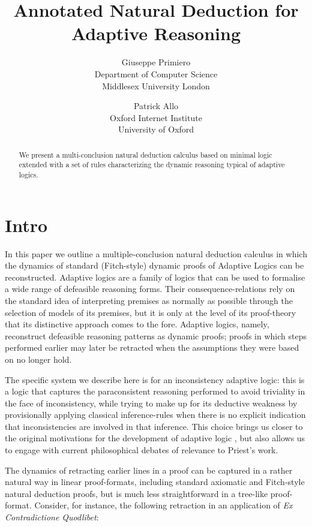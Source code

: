 \documentclass[]{article}
\title{Annotated Natural Deduction for Adaptive Reasoning}
\author{Giuseppe Primiero\\
Department of Computer Science\\
Middlesex University London\\
 \and Patrick Allo\\
 Oxford Internet Institute\\
 University of Oxford}
\date{}
\begin{document}
\maketitle

\begin{abstract}
We present a multi-conclusion natural deduction calculus based on minimal logic extended with a set of rules characterizing the dynamic reasoning typical of adaptive logics.
\end{abstract}

\section{Intro}

In this paper we outline a multiple-conclusion natural deduction calculus in which the dynamics of standard (Fitch-style) dynamic proofs of Adaptive Logics \cite{batens07} can be reconstructed. Adaptive logics are a family of logics that can be used to formalise a wide range of defeasible reasoning forms. Their consequence-relations rely on the standard idea of interpreting premises as normally as possible through the selection of models of its premises, but it is only at the level of its proof-theory that its distinctive approach comes to the fore. Adaptive logics, namely, reconstruct defeasible reasoning patterns as dynamic proofs; proofs in which steps performed earlier may later be retracted when the assumptions they were based on no longer hold.

The specific system we describe here is for an inconsistency adaptive logic: this is a logic that captures the paraconsistent reasoning performed to avoid triviality in the face of inconsistency, while trying to make up for its deductive weakness by provisionally applying classical inference-rules when there is no explicit indication that inconsistencies are involved in that inference. This choice brings us closer to the original motivations for the development of adaptive logic \cite{Batens:ParaconsistentLogicEssaysOnTheInconsistent:1989}, but also allows us to engage with current philosophical debates of relevance to Priest's work.

The dynamics of retracting earlier lines in a proof can be captured in a rather natural way in linear proof-formats, including standard axiomatic and Fitch-style natural deduction proofs, but is much less straightforward in a tree-like proof-format. Consider, for instance, the following retraction in an application of \emph{Ex Contradictione Quodlibet}:
\end{document}
